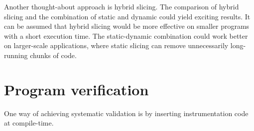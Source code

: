 
Another thought-about approach is hybrid slicing.
The comparison of hybrid slicing and the combination of static and dynamic 
could yield exciting results.
It can be assumed that hybrid slicing would be more effective on smaller 
programs with a short execution time.
The static-dynamic combination could work better on larger-scale 
applications, where static slicing can remove unnecessarily long-running 
chunks of code.


\section{Program verification}\label{chap:verification}




One way of achieving systematic validation is by inserting 
instrumentation code at compile-time.

